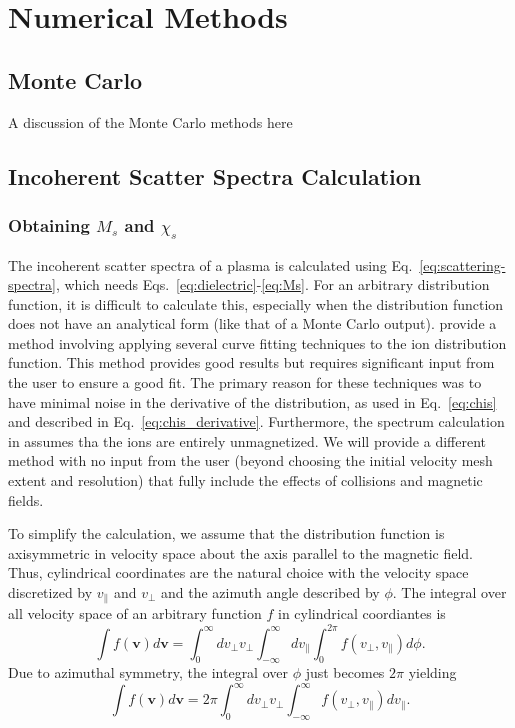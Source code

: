 \chapter{Numerical Methods}

\section{Monte Carlo}

A discussion of the Monte Carlo methods here



\section{Incoherent Scatter Spectra Calculation}

\subsection{Obtaining $M_s$ and $\chi_s$}

The incoherent scatter spectra of a plasma is calculated using Eq.~\ref{eq:scattering-spectra}, which needs Eqs.~\ref{eq:dielectric}-\ref{eq:Ms}.
For an arbitrary distribution function, it is difficult to calculate this, especially when the distribution function does not have an analytical form (like that of a Monte Carlo output).
\cite{goodwin2018} provide a method involving applying several curve fitting techniques to the ion distribution function. 
This method provides good results but requires significant input from the user to ensure a good fit. %
The primary reason for these techniques was to have minimal noise in the derivative of the distribution, as used in Eq.~\ref{eq:chis} and described in Eq.~\ref{eq:chis_derivative}.
Furthermore, the spectrum calculation in \citep{goodwin2018} assumes tha the ions are entirely unmagnetized. 
We will provide a different method with no input from the user (beyond choosing the initial velocity mesh extent and resolution) that fully include the effects of collisions and magnetic fields.


To simplify the calculation, we assume that the distribution function is axisymmetric in velocity space about the axis parallel to the magnetic field. 
Thus, cylindrical coordinates are the natural choice with the velocity space discretized by $v_\parallel$ and $v_\perp$ and the azimuth angle described by $\phi$.
The integral over all velocity space of an arbitrary function $f$ in cylindrical coordiantes is
\begin{equation}
	\int f(\mathbf{v}) d\mathbf{v} = \int_0^\infty  dv_\perp v_\perp  \int_{-\infty}^\infty dv_\parallel \int_0^{2\pi} f(v_\perp, v_\parallel) d\phi.
	\label{eq:cylindrical_integration}
\end{equation}
Due to azimuthal symmetry, the integral over $\phi$ just becomes $2\pi$ yielding
\begin{equation}
	\int f(\mathbf{v}) d\mathbf{v} = 2\pi \int_0^\infty  dv_\perp v_\perp  \int_{-\infty}^\infty f(v_\perp, v_\parallel)  dv_\parallel.
	\label{eq:cylind_int_2pi}
\end{equation}


